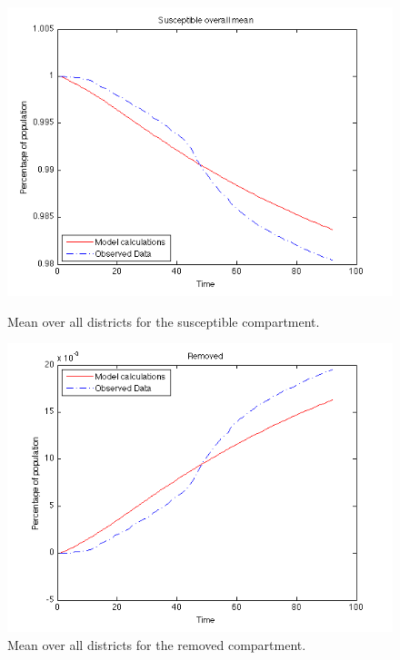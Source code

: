 \documentclass[11pt]{article}
\begin{document}
\begin{figure}
  \begin{minipage}[t]{0.49\textwidth}
    \centering
    \includegraphics[width=\textwidth]{Bilder/susceptible_mean.png} 
    \caption{Mean over all districts for the susceptible compartment.}
	\label{fig:mean_susceptible}
  \end{minipage}
  \hspace{0.02\textwidth}
  \begin{minipage}[t]{0.49\textwidth}
    \centering
    \includegraphics[width=\textwidth]{Bilder/removed_mean.png} 
    \caption{Mean over all districts for the removed compartment.}
	\label{fig:mean_removed}
  \end{minipage}
\end{figure}
\end{document}
